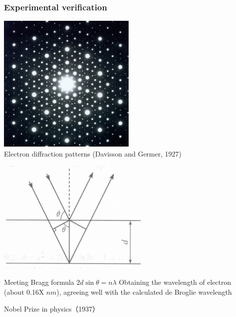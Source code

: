 \begin{frame}   
  \frametitle{Experimental verification}
  \begin{center}
    \includegraphics[width=0.5\textwidth]{figs/elediffr.jpeg} \\
    Electron diffraction patterns (Davisson and Germer, 1927)
    \end{center} 
\end{frame}
\begin{frame}   
    \begin{center}
      \includegraphics[width=0.55\textwidth]{figs/scatting.png} \\
    \end{center} 
    \begin{itemize}
        \Item  Meeting Bragg formula $2d\sin \theta=n\lambda $
        \Item  Obtaining the wavelength of electron (about 0.16X $nm$), agreeing well with the 
   calculated de Broglie wavelength 
    \end{itemize}
  {\color{deepred} Nobel Prize in physics（1937）}  
  \end{frame}

